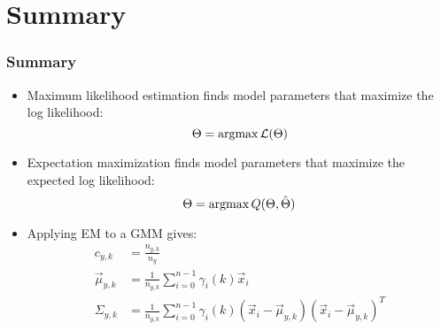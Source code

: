\documentclass{beamer}
\newcommand{\argmax}{\operatornamewithlimits{argmax}}
\begin{document}
\section{Summary}
\setcounter{subsection}{1}

\begin{frame}
  \frametitle{Summary}

  \begin{itemize}
  \item Maximum likelihood estimation finds model parameters that
    maximize the log likelihood:
    \[
    \Theta = \argmax{\mathcal L}(\Theta)
    \]
  \item Expectation maximization finds model parameters that maximize the
    expected log likelihood:
    \[
    \Theta = \argmax Q(\Theta,\hat\Theta)
    \]
  \item Applying EM to a GMM gives:
    \begin{align*}
      c_{y,k} &= \frac{n_{y,k}}{n_y}\\
      \vec\mu_{y,k} &=\frac{1}{n_{y,k}}\sum_{i=0}^{n-1}\gamma_i(k)\vec{x}_i\\
      \Sigma_{y,k} &=
      \frac{1}{n_{y,k}}\sum_{i=0}^{n-1}\gamma_i(k)(\vec{x}_i-\vec\mu_{y,k})(\vec{x}_i-\vec\mu_{y,k})^T
    \end{align*}
  \end{itemize}
\end{frame}
\end{document}
